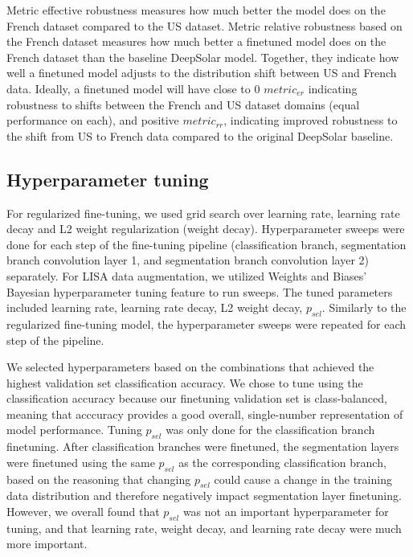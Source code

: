 \documentclass[10pt,twocolumn,letterpaper]{article}
\begin{document}
Metric effective robustness measures how much better the model does on the French dataset compared to the US dataset. Metric relative robustness based on the French dataset measures how much better a finetuned model does on the French dataset than the baseline DeepSolar model. Together, they indicate how well a finetuned model adjusts to the distribution shift between US and French data. Ideally, a finetuned model will have close to 0 $metric_{er}$ indicating robustness to shifts between the French and US dataset domains (equal performance on each), and positive $metric_{rr}$, indicating improved robustness to the shift from US to French data compared to the original DeepSolar baseline.


\subsection{Hyperparameter tuning}

For regularized fine-tuning, we used grid search over learning rate, learning rate decay and L2 weight regularization (weight decay). Hyperparameter sweeps were done for each step of the fine-tuning pipeline (classification branch, segmentation branch convolution layer 1, and segmentation branch convolution layer 2) separately. For LISA data augmentation, we utilized Weights and Biases' \cite{wandb} Bayesian hyperparameter tuning \cite{bayesiantuning} feature to run sweeps. The tuned parameters included learning rate, learning rate decay, L2 weight decay, $p_{sel}$. Similarly to the regularized fine-tuning model, the hyperparameter sweeps were repeated for each step of the pipeline.  

We selected hyperparameters based on the combinations that achieved the highest validation set classification accuracy. We chose to tune using the classification accuracy because our finetuning validation set is class-balanced, meaning that acccuracy provides a good overall, single-number representation of model performance. Tuning $p_{sel}$ was only done for the classification branch finetuning. After classification branches were finetuned, the segmentation layers were finetuned using the same $p_{sel}$ as the corresponding classification branch, based on the reasoning that changing $p_{sel}$ could cause a change in the training data distribution and therefore negatively impact segmentation layer finetuning. However, we overall found that $p_{sel}$ was not an important hyperparameter for tuning, and that learning rate, weight decay, and learning rate decay were much more important.
\end{document}
